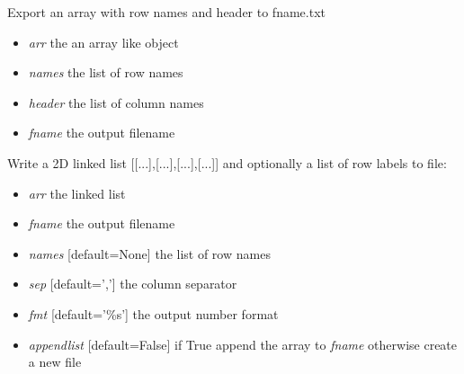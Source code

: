 \documentclass[a4paper,11pt,english]{sphinxmanual}
\begin{document}

\begin{fulllineitems}
\label{modules_doc:cbmpy.CBTools.exportLabelledArrayWithHeader2TXT}
Export an array with row names and header to fname.txt
\begin{itemize}
\item {} 
\emph{arr} the an array like object

\item {} 
\emph{names} the list of row names

\item {} 
\emph{header} the list of column names

\item {} 
\emph{fname} the output filename

\end{itemize}

\end{fulllineitems}


\begin{fulllineitems}
\label{modules_doc:cbmpy.CBTools.exportLabelledLinkedList}
Write a 2D linked list {[}{[}...{]},{[}...{]},{[}...{]},{[}...{]}{]} and optionally a list of row labels to file:
\begin{itemize}
\item {} 
\emph{arr} the linked list

\item {} 
\emph{fname} the output filename

\item {} 
\emph{names} {[}default=None{]} the list of row names

\item {} 
\emph{sep} {[}default=','{]} the column separator

\item {} 
\emph{fmt} {[}default='\%s'{]} the output number format

\item {} 
\emph{appendlist} {[}default=False{]} if True append the array to \emph{fname} otherwise create a new file

\end{itemize}

\end{fulllineitems}
\end{document}

